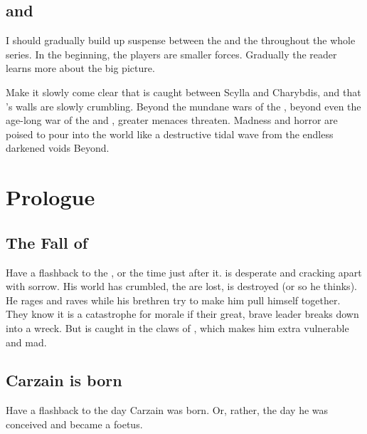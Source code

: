 \subsection{\Banes and \xss}
I should gradually build up suspense between the \banes and the \xss throughout the whole series. 
In the beginning, the players are smaller forces.
Gradually the reader learns more about the big picture. 

Make it slowly come clear that \Miith is caught between Scylla and Charybdis, and that \Miith's walls are slowly crumbling. 
Beyond the mundane wars of the \Miithians, beyond even the age-long war of the \dragons and \resphain, greater menaces threaten. 
Madness and horror are poised to pour into the world like a destructive tidal wave from the endless darkened voids Beyond. 



















\section{Prologue}









\subsection{The Fall of \Kezerad}
Have a flashback to the , or the time just after it. 
\Sithiyacaan is desperate and cracking apart with sorrow. 
His world has crumbled, the \beacons are lost, \Essenai is destroyed (or so he thinks). 
He rages and raves while his brethren try to make him pull himself together. 
They know it is a catastrophe for morale if their great, brave leader breaks down into a wreck. 
But \Sithiyacaan is caught in the claws of \NexagglachelsCurse, which makes him extra vulnerable and mad. 









\subsection{Carzain is born}
Have a flashback to the day Carzain was born. 
Or, rather, the day he was conceived and became a foetus.

